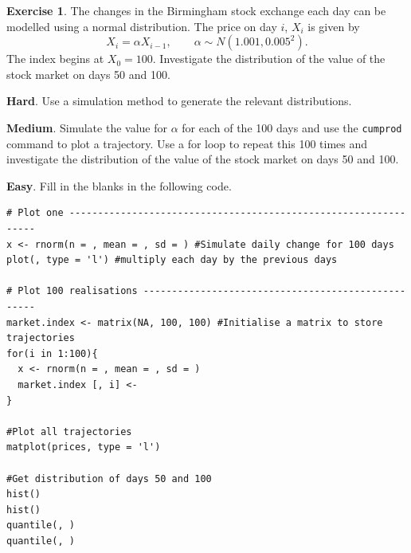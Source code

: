 \documentclass[
]{book}
\theoremstyle{definition}
\theoremstyle{definition}
\theoremstyle{definition}
\newtheorem{exercise}{Exercise}[chapter]
\theoremstyle{definition}
\theoremstyle{remark}
\begin{document}
\begin{exercise}

The changes in the Birmingham stock exchange each day can be modelled using a normal distribution. The price on day \(i\), \(X_i\) is given by
\[
X_i = \alpha X_{i-1}, \qquad \alpha \sim N(1.001, 0.005^2).
\]
The index begins at \(X_0 = 100\). Investigate the distribution of the value of the stock market on days 50 and 100.

\textbf{Hard}. Use a simulation method to generate the relevant distributions.

\textbf{Medium}. Simulate the value for \(\alpha\) for each of the 100 days and use the \texttt{cumprod} command to plot a trajectory. Use a for loop to repeat this 100 times and investigate the distribution of the value of the stock market on days 50 and 100.

\textbf{Easy}. Fill in the blanks in the following code.

\begin{verbatim}
# Plot one ----------------------------------------------------------------
x <- rnorm(n = , mean = , sd = ) #Simulate daily change for 100 days
plot(, type = 'l') #multiply each day by the previous days

# Plot 100 realisations ---------------------------------------------------
market.index <- matrix(NA, 100, 100) #Initialise a matrix to store trajectories
for(i in 1:100){
  x <- rnorm(n = , mean = , sd = )
  market.index [, i] <- 
}

#Plot all trajectories
matplot(prices, type = 'l')

#Get distribution of days 50 and 100
hist()
hist()
quantile(, )
quantile(, )
\end{verbatim}

\end{exercise}
\end{document}

